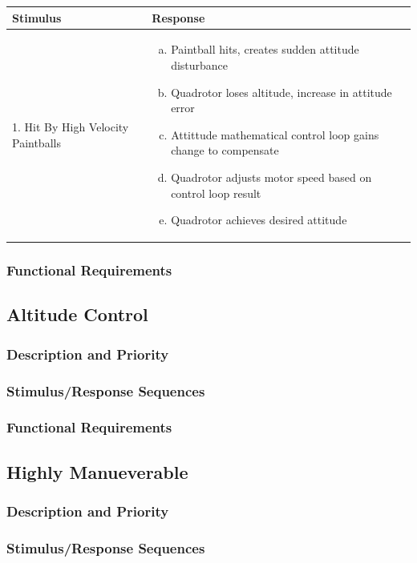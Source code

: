 \documentclass[english]{article}
\numberwithin{equation}{section} %
\begin{document}
\begin{longtable}{p{3cm} | p{10cm}}
\hline
\textbf{Stimulus} & \textbf{Response}\\
\hline
1. Hit By High Velocity Paintballs &
\begin{enumerate}[(a)]\itemsep1pt %
\item Paintball hits, creates sudden attitude disturbance
\item Quadrotor loses altitude, increase in attitude error
\item Attittude mathematical control loop gains change to compensate
\item Quadrotor adjusts motor speed based on control loop result
\item Quadrotor achieves desired attitude
\end{enumerate}
\\ 
\hline
\end{longtable}



\subsubsection{Functional Requirements}

\subsection{Altitude Control}
\subsubsection{Description and Priority}
\subsubsection{Stimulus/Response Sequences}
\subsubsection{Functional Requirements}

\subsection{Highly Manueverable}
\subsubsection{Description and Priority}
\subsubsection{Stimulus/Response Sequences}
\end{document}
